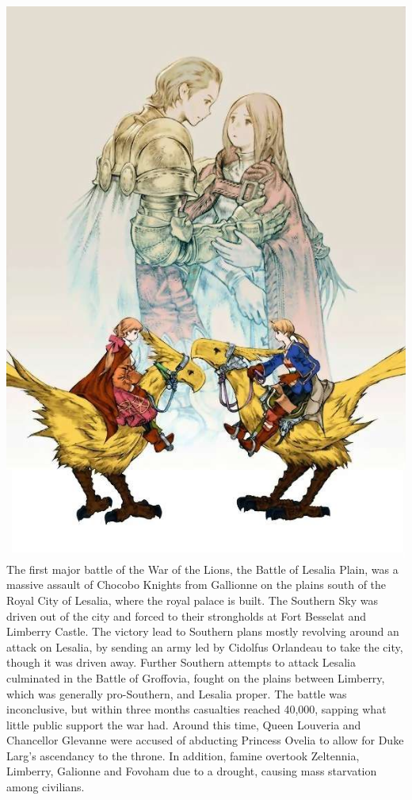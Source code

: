 \includegraphics[width=\columnwidth]{./art/worldbook/cover.jpg}
\ofpar
%
The first major battle of the War of the Lions, the Battle of Lesalia Plain, was a massive assault of Chocobo Knights from Gallionne on the plains south of the Royal City of Lesalia, where the royal palace is built. 
The Southern Sky was driven out of the city and forced to their strongholds at Fort Besselat and Limberry Castle. 
The victory lead to Southern plans mostly revolving around an attack on Lesalia, by sending an army led by Cidolfus Orlandeau to take the city, though it was driven away.
Further Southern attempts to attack Lesalia culminated in the Battle of Groffovia, fought on the plains between Limberry, which was generally pro-Southern, and Lesalia proper. 
The battle was inconclusive, but within three months casualties reached 40,000, sapping what little public support the war had.
Around this time, Queen Louveria and Chancellor Glevanne were accused of abducting Princess Ovelia to allow for Duke Larg's ascendancy to the throne. In addition, famine overtook Zeltennia, Limberry, Galionne and Fovoham due to a drought, causing mass starvation among civilians.
